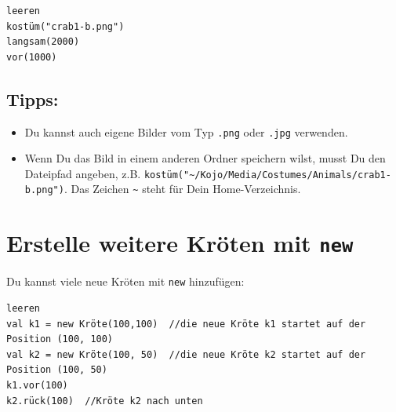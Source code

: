 \begin{lstlisting}[basicstyle={\ttfamily\fontsize{12}{15}\selectfont},numbers=none]
leeren
kostüm("crab1-b.png")  
langsam(2000)
vor(1000)
\end{lstlisting}
        
\section*{\color{OliveGreen}Tipps:}


\begin{itemize}

\item {Du kannst auch eigene Bilder vom Typ \lstinline{.png} oder \lstinline{.jpg} verwenden.}
\item {Wenn Du das Bild in einem anderen Ordner speichern wilst, musst Du den Dateipfad angeben, z.B. \lstinline{kostüm("~/Kojo/Media/Costumes/Animals/crab1-b.png")}. Das Zeichen \lstinline{~} steht für Dein Home-Verzeichnis.}

\end{itemize}


\chapter{Erstelle weitere Kröten mit \lstinline{new}}Du kannst viele neue Kröten mit \lstinline{new} hinzufügen:

\begin{lstlisting}[basicstyle={\ttfamily\fontsize{18}{22}\selectfont},numbers=none]
leeren
val k1 = new Kröte(100,100)  //die neue Kröte k1 startet auf der Position (100, 100)
val k2 = new Kröte(100, 50)  //die neue Kröte k2 startet auf der Position (100, 50)
k1.vor(100)
k2.rück(100)  //Kröte k2 nach unten
\end{lstlisting}
        

  
